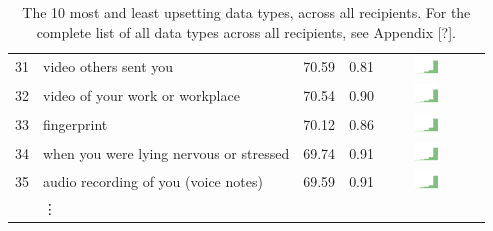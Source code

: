 \begin{table}[t]
\begin{center}
\begin{tabular}{| r | l | r | r | r | r |}
31 & video others sent you & 70.59 & 0.81 & \includegraphics[width = 2cm, height = 0.5cm]{tex-inputs/table-images/sharedvideosotherssentyousavedonyourdevicecombined} \\ 
32 & video of your work or workplace & 70.54 & 0.90 & \includegraphics[width = 2cm, height = 0.5cm]{tex-inputs/table-images/tookvideosatwork(withanoutward-facingcamera)combined} \\ 
33 & fingerprint & 70.12 & 0.86 & \includegraphics[width = 2cm, height = 0.5cm]{tex-inputs/table-images/learnedyourfingerprintsomehowcombined} \\ 
34 & when you were lying nervous or stressed & 69.74 & 0.91 & \includegraphics[width = 2cm, height = 0.5cm]{tex-inputs/table-images/learnedwhenyouwerelyingnervousorstressedcombined} \\ 
35 & audio recording of you (voice notes) & 69.59 & 0.91 & \includegraphics[width = 2cm, height = 0.5cm]{tex-inputs/table-images/recordedyoutalkingtoyourself(makingvoicenotes)combined} \\ 
& \vdots & & & \\
\hline
\end{tabular}
\caption{The 10 most and least upsetting data types, across all recipients. For the complete list of all data types across all recipients, see Appendix [?].}
\label{top10-table}
\end{center}
\end{table}


